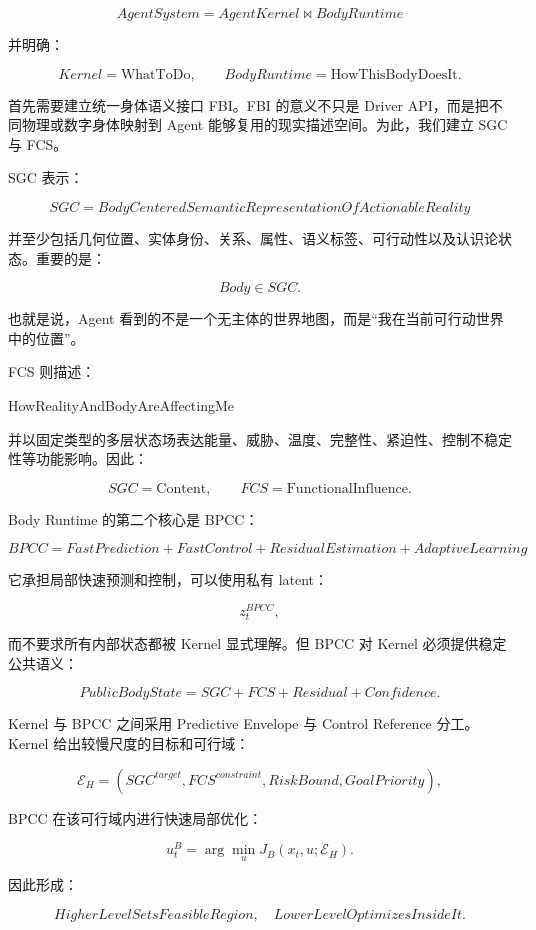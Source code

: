 \[
\boxed{
AgentSystem
=
AgentKernel
\bowtie
BodyRuntime
}
\]

并明确：

\[
Kernel=\mathrm{WhatToDo},
\qquad
BodyRuntime=\mathrm{HowThisBodyDoesIt}.
\]

首先需要建立统一身体语义接口 FBI。FBI 的意义不只是 Driver API，而是把不同物理或数字身体映射到 Agent 能够复用的现实描述空间。为此，我们建立 SGC 与 FCS。

SGC 表示：

\[
\boxed{
SGC=
BodyCenteredSemanticRepresentationOfActionableReality
}
\]

并至少包括几何位置、实体身份、关系、属性、语义标签、可行动性以及认识论状态。重要的是：

\[
Body\in SGC.
\]

也就是说，Agent 看到的不是一个无主体的世界地图，而是“我在当前可行动世界中的位置”。

FCS 则描述：

\begin{statementbox}
HowRealityAndBodyAreAffectingMe
\end{statementbox}

并以固定类型的多层状态场表达能量、威胁、温度、完整性、紧迫性、控制不稳定性等功能影响。因此：

\[
SGC=\mathrm{Content},
\qquad
FCS=\mathrm{FunctionalInfluence}.
\]

Body Runtime 的第二个核心是 BPCC：

\[
\boxed{
BPCC
=
FastPrediction
+
FastControl
+
ResidualEstimation
+
AdaptiveLearning
}
\]

它承担局部快速预测和控制，可以使用私有 latent：

\[
z_t^{BPCC},
\]

而不要求所有内部状态都被 Kernel 显式理解。但 BPCC 对 Kernel 必须提供稳定公共语义：

\[
PublicBodyState
=
SGC+FCS+Residual+Confidence.
\]

Kernel 与 BPCC 之间采用 Predictive Envelope 与 Control Reference 分工。Kernel 给出较慢尺度的目标和可行域：

\[
\mathcal E_H
=
(
SGC^{target},
FCS^{constraint},
RiskBound,
GoalPriority
),
\]

BPCC 在该可行域内进行快速局部优化：

\[
u_t^{B}
=
\arg\min_u
J_B
(x_t,u;\mathcal E_H).
\]

因此形成：

\[
\boxed{
HigherLevelSetsFeasibleRegion,
\quad
LowerLevelOptimizesInsideIt.
}
\]

